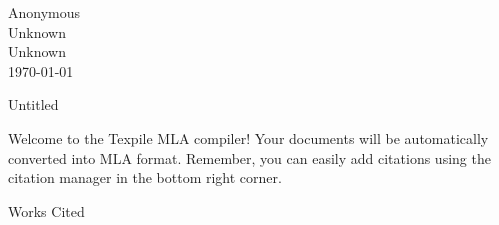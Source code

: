 \documentclass[12pt]{article}
\newenvironment{workscited}{\newpage\begin{center}Works Cited\end{center}}{\newpage}
\begin{document}
\noindent Anonymous\\Unknown\\Unknown\\\today\\
\begin{center}\textnormal{Untitled}\end{center}
\begin{flushleft}

\hspace{0.5in}Welcome to the Texpile MLA compiler! Your documents will be automatically converted into MLA format. Remember, you can easily add citations using the citation manager in the bottom right corner.

\end{flushleft}
\begin{workscited}\printbibliography[heading=none]\end{workscited}
\end{document}
